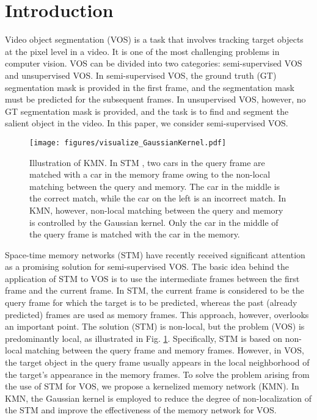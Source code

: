 \section{Introduction}
\label{s1}
Video object segmentation (VOS) is a task that involves tracking target objects at the pixel level in a video. It is one of the most challenging problems in computer vision. VOS can be divided into two categories: semi-supervised VOS and unsupervised VOS. In semi-supervised VOS, the ground truth (GT) segmentation mask is provided in the first frame, and the segmentation mask must be predicted for the subsequent frames. In unsupervised VOS, however, no GT segmentation mask is provided, and the task is to find and segment the salient object in the video. In this paper, we consider semi-supervised VOS.

\begin{figure}[t]
\centering
\texttt{[image: figures/visualize\_GaussianKernel.pdf]}
\caption{
Illustration of KMN. In STM \cite{Oh_2019_ICCV}, two cars in the query frame are matched with a car in the memory frame owing to the non-local matching between the query and memory. The car in the middle is the correct match, while the car on the left is an incorrect match. In KMN, however, non-local matching between the query and memory is controlled by the Gaussian kernel. Only the car in the middle of the query frame is matched with the car in the memory.
}
\label{fig:visualize_GaussianKernel}
\end{figure}

Space-time memory networks (STM) \cite{Oh_2019_ICCV} have recently received significant attention as a promising solution for semi-supervised VOS. The basic idea behind the application of STM to VOS is to use the intermediate frames between the first frame and the current frame. In STM, the current frame is considered to be the query frame for which the target is to be predicted, whereas the past (already predicted) frames are used as memory frames. This approach, however, overlooks an important point. The solution (STM) is non-local, but the problem (VOS) is predominantly local, as illustrated in Fig. \ref{fig:visualize_GaussianKernel}. Specifically, STM is based on non-local matching between the query frame and memory frames. However, in VOS, the target object in the query frame usually appears in the local neighborhood of the target’s appearance in the memory frames. To solve the problem arising from the use of STM for VOS, we propose a kernelized memory network (KMN). In KMN, the Gaussian kernel is employed to reduce the degree of non-localization of the STM and improve the effectiveness of the memory network for VOS.

